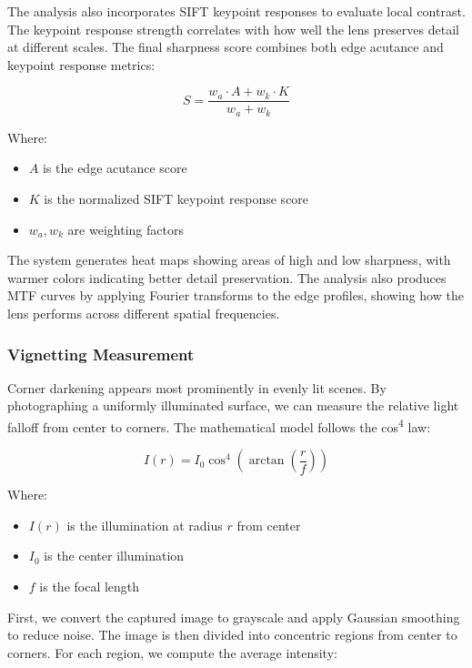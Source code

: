 The analysis also incorporates SIFT keypoint responses to evaluate local contrast. The keypoint response strength correlates with how well the lens preserves detail at different scales. The final sharpness score combines both edge acutance and keypoint response metrics:

\begin{equation}
S = \frac{w_a \cdot A + w_k \cdot K}{w_a + w_k}
\end{equation}

Where:
\begin{itemize}
    \item \( A \) is the edge acutance score
    \item \( K \) is the normalized SIFT keypoint response score
    \item \( w_a, w_k \) are weighting factors
\end{itemize}

The system generates heat maps showing areas of high and low sharpness, with warmer colors indicating better detail preservation. The analysis also produces MTF curves by applying Fourier transforms to the edge profiles, showing how the lens performs across different spatial frequencies.

\subsubsection{Vignetting Measurement}
Corner darkening appears most prominently in evenly lit scenes. By photographing a uniformly illuminated surface, we can measure the relative light falloff from center to corners. The mathematical model follows the cos\textsuperscript{4} law:

\begin{equation}
I(r) = I_0 \cos^4\left(\arctan\left(\frac{r}{f}\right)\right)
\end{equation}

Where:
\begin{itemize}
    \item \( I(r) \) is the illumination at radius \( r \) from center
    \item \( I_0 \) is the center illumination
    \item \( f \) is the focal length
\end{itemize}

First, we convert the captured image to grayscale and apply Gaussian smoothing to reduce noise. The image is then divided into concentric regions from center to corners. For each region, we compute the average intensity:

